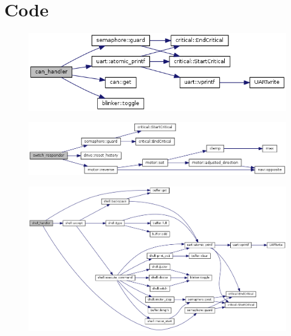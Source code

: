 \documentclass[12pt]{article}
\begin{document}
\newpage
\section{Code}
\label{sec:code}









\begin{figure}[H]
  \includegraphics[width=\textwidth]{./img/motor_can_handler.png}
\end{figure}

\begin{figure}[H]
  \includegraphics[width=\textwidth]{./img/switch_responder.png}
\end{figure}

\begin{figure}[H]
  \includegraphics[width=\textwidth]{./img/shell_handler.png}
\end{figure}
\end{document}

